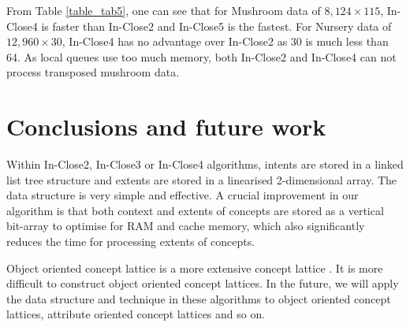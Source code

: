 \documentclass[11pt]{article}
\numberwithin{equation}{subsection}
\begin{document}

 From Table \ref{table_tab5}, one can see that for Mushroom data of $8,124\times 115$, In-Close4 is faster than In-Close2 and In-Close5 is the fastest. For Nursery data of $12,960\times 30$, In-Close4 has no advantage over In-Close2 as 30 is much less than 64.
 As local queues use too much memory, both In-Close2  and In-Close4 can not process transposed mushroom data.


\section{Conclusions and future work\label{s5}}

Within In-Close2, In-Close3 or In-Close4  algorithms, intents are stored in a linked list tree structure and extents are stored in a linearised 2-dimensional   array. The data structure is very simple and effective.
A crucial improvement in our algorithm is that both context and extents of
concepts are stored as a vertical bit-array to optimise for RAM and cache memory, which also significantly reduces   the time for processing extents of
concepts.

Object oriented concept lattice is a more extensive concept lattice \cite{Yao}. It is more difficult to construct object oriented concept lattices.
In the future, we will apply the data structure and technique in these algorithms  to  object oriented concept lattices, %
attribute oriented concept lattices and so on.


%
\end{document}
